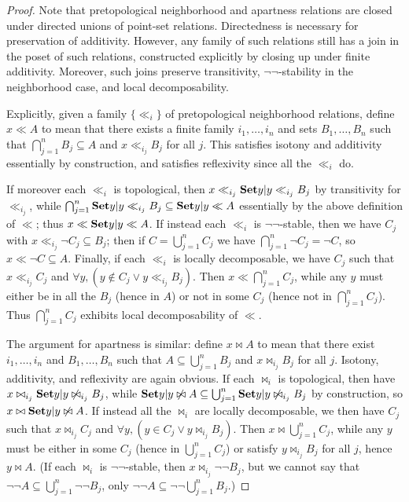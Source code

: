 \documentclass{article}
\def\cpl#1{\neg #1}
\def\nn{\ensuremath{\neg\neg}}
\begin{document}
\begin{proof}
  Note that pretopological neighborhood and apartness relations are closed under directed unions of point-set relations.
  Directedness is necessary for preservation of additivity.
  However, any family of such relations still has a join in the poset of such relations, constructed explicitly by closing up under finite additivity.
  Moreover, such joins preserve transitivity, \nn-stability in the neighborhood case, and local decomposability.

  Explicitly, given a family $\{\ll_i\}$ of pretopological neighborhood relations, define $x\ll A$ to mean that there exists a finite family $i_1,\dots,i_n$ and sets $B_1,\dots, B_n$ such that $\bigcap_{j=1}^n B_j \subseteq A$ and $x\ll_{i_j} B_j$ for all $j$.
  This satisfies isotony and additivity essentially by construction, and satisfies reflexivity since all the $\ll_i$ do.

  If moreover each $\ll_i$ is topological, then $x\ll_{i_j} \setof{y|y\ll_{i_j} B_j}$ by transitivity for $\ll_{i_j}$, while $\bigcap_{j=1}^n \setof{y|y\ll_{i_j} B_j} \subseteq \setof{y|y\ll A}$ essentially by the above definition of $\ll$; thus $x\ll \setof{y|y\ll A}$.
  If instead each $\ll_i$ is \nn-stable, then we have $C_j$ with $x\ll_{i_j} \cpl{C_j}\subseteq B_j$; then if $C = \bigcup_{j=1}^n C_j$ we have $\bigcap_{j=1}^n \cpl{C_j} = \cpl{C}$, so $x\ll \cpl{C} \subseteq A$.
  Finally, if each $\ll_i$ is locally decomposable, we have $C_j$ such that $x\ll_{i_j} C_j$ and $\forall y, (y\notin C_j \lor y\ll_{i_j} B_j)$.
  Then $x \ll \bigcap_{j=1}^n C_j$, while any $y$ must either be in all the $B_j$ (hence in $A$) or not in some $C_j$ (hence not in $\bigcap_{j=1}^n C_j$).
  Thus $\bigcap_{j=1}^n C_j$ exhibits local decomposability of $\ll$.

  The argument for apartness is similar: define $x\bowtie A$ to mean that there exist $i_1,\dots,i_n$ and $B_1,\dots, B_n$ such that $A\subseteq \bigcup_{j=1}^n B_j$ and $x\bowtie_{i_j} B_j$ for all $j$.
  Isotony, additivity, and reflexivity are again obvious.
  If each $\bowtie_i$ is topological, then have $x\bowtie_{i_j} \setof{y|y\not\bowtie_{i_j} B_j}$, while $\setof{y|y\not\bowtie A} \subseteq \bigcup_{j=1}^n\setof{y|y\not\bowtie_{i_j} B_j}$ by construction, so $x\bowtie \setof{y|y\not\bowtie A}$.
  If instead all the $\bowtie_i$ are locally decomposable, we then have $C_j$ such that $x\bowtie_{i_j} C_j$ and $\forall y, (y\in C_j \lor y\bowtie_{i_j} B_j)$.
  Then $x\bowtie \bigcup_{j=1}^n C_j$, while any $y$ must be either in some $C_j$ (hence in $\bigcup_{j=1}^n C_j$) or satisfy $y\bowtie_{i_j} B_j$ for all $j$, hence $y\bowtie A$.
  (If each $\bowtie_i$ is \nn-stable, then $x\bowtie_{i_j} \cpl{\cpl{B_j}}$, but we cannot say that $\cpl{\cpl{A}} \subseteq \bigcup_{j=1}^n \cpl{\cpl{B_j}}$, only $\cpl{\cpl{A}} \subseteq \cpl{\cpl{\bigcup_{j=1}^n B_j}}$.)


\end{proof}
\end{document}
